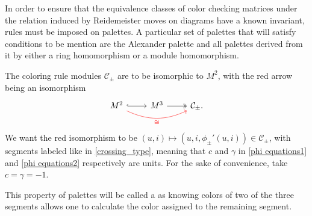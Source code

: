\begin{example}
\begin{center}
  \end{center}
\end{example}

In order to ensure that the equivalence classes of color checking matrices under the relation induced by Reidemeister moves on diagrams have a known invariant, rules must be imposed on palettes. A particular set of palettes that will satisfy conditions to be mention are the Alexander palette and all palettes derived from it by either a ring homomorphism or a module homomorphism.

The coloring rule modules $\mathcal{C}_\pm$ are to be isomorphic to $M^2$, with the red arrow being an isomorphism
    $$
    \begin{tikzcd}
      M^2 \arrow[r, hookrightarrow] \arrow[rr, bend right=25, red, "\cong" below] & M^3 \arrow[twoheadrightarrow, r] & \mathcal{C}_\pm.
    \end{tikzcd}
    $$
    We want the red isomorphism to be $(u, i)\mapsto (u, i, \phi_\pm'(u, i))\in\mathcal{C}_\pm$, with segments labeled like in \cref{crossing_type}, meaning that $c$ and $\gamma$ in \eqref{phi equations1} and \eqref{phi equations2} respectively are units. For the sake of convenience, take $c=\gamma=-1$.

    This property of palettes will be called a  as knowing colors of two of the three segments allows one to calculate the color assigned to the remaining segment.

